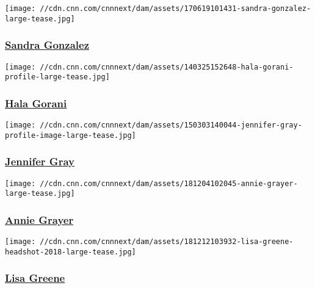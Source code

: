 \href{/profiles/sandra-gonzalez}{}

\texttt{[image: //cdn.cnn.com/cnnnext/dam/assets/170619101431-sandra-gonzalez-large-tease.jpg]}

\hypertarget{sandra-gonzalez}{%
\subsubsection{\texorpdfstring{\href{/profiles/sandra-gonzalez}{Sandra
Gonzalez}}{Sandra Gonzalez}}\label{sandra-gonzalez}}

\href{/profiles/hala-gorani-profile}{}

\texttt{[image: //cdn.cnn.com/cnnnext/dam/assets/140325152648-hala-gorani-profile-large-tease.jpg]}

\hypertarget{hala-gorani}{%
\subsubsection{\texorpdfstring{\href{/profiles/hala-gorani-profile}{Hala
Gorani}}{Hala Gorani}}\label{hala-gorani}}

\href{/profiles/jennifer-gray-profile}{}

\texttt{[image: //cdn.cnn.com/cnnnext/dam/assets/150303140044-jennifer-gray-profile-image-large-tease.jpg]}

\hypertarget{jennifer-gray}{%
\subsubsection{\texorpdfstring{\href{/profiles/jennifer-gray-profile}{Jennifer
Gray}}{Jennifer Gray}}\label{jennifer-gray}}

\href{/profiles/annie-grayer}{}

\texttt{[image: //cdn.cnn.com/cnnnext/dam/assets/181204102045-annie-grayer-large-tease.jpg]}

\hypertarget{annie-grayer}{%
\subsubsection{\texorpdfstring{\href{/profiles/annie-grayer}{Annie
Grayer}}{Annie Grayer}}\label{annie-grayer}}

\href{/profiles/lisa-greene-profile}{}

\texttt{[image: //cdn.cnn.com/cnnnext/dam/assets/181212103932-lisa-greene-headshot-2018-large-tease.jpg]}

\hypertarget{lisa-greene}{%
\subsubsection{\texorpdfstring{\href{/profiles/lisa-greene-profile}{Lisa
Greene}}{Lisa Greene}}\label{lisa-greene}}

